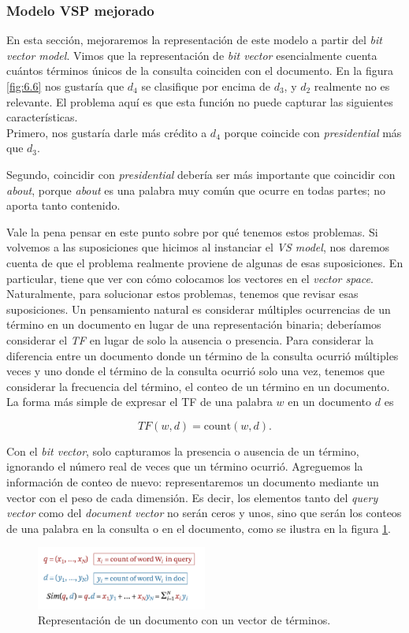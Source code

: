 \subsubsection{Modelo VSP mejorado}

En esta sección, mejoraremos la representación de este modelo a partir del \textit{bit vector model}. Vimos que la representación de \textit{bit vector} esencialmente cuenta cuántos términos únicos de la consulta coinciden con el documento. En la figura \ref{fig:6.6} nos gustaría que $d_4$ se clasifique por encima de $d_3$, y $d_2$ realmente no es relevante. El problema aquí es que esta función no puede capturar las siguientes características.  \\

Primero, nos gustaría darle más crédito a $d_4$ porque coincide con \textit{presidential} más que $d_3$.

Segundo, coincidir con \textit{presidential} debería ser más importante que coincidir con \textit{about}, porque \textit{about} es una palabra muy común que ocurre en todas partes; no aporta tanto contenido.

Vale la pena pensar en este punto sobre por qué tenemos estos problemas. Si volvemos a las suposiciones que hicimos al instanciar el \textit{VS model}, nos daremos cuenta de que el problema realmente proviene de algunas de esas suposiciones. En particular, tiene que ver con cómo colocamos los vectores en el \textit{vector space}. Naturalmente, para solucionar estos problemas, tenemos que revisar esas suposiciones. Un pensamiento natural es considerar múltiples ocurrencias de un término en un documento en lugar de una representación binaria; deberíamos considerar el \textit{TF} en lugar de solo la ausencia o presencia. Para considerar la diferencia entre un documento donde un término de la consulta ocurrió múltiples veces y uno donde el término de la consulta ocurrió solo una vez, tenemos que considerar la frecuencia del término, el conteo de un término en un documento. La forma más simple de expresar el TF de una palabra $w$ en un documento $d$ es

\begin{equation}
TF(w,d) = \text{count}(w,d).
\end{equation}

Con el \textit{bit vector}, solo capturamos la presencia o ausencia de un término, ignorando el número real de veces que un término ocurrió. Agreguemos la información de conteo de nuevo: representaremos un documento mediante un vector con el peso de cada dimensión. Es decir, los elementos tanto del \textit{query vector} como del \textit{document vector} no serán ceros y unos, sino que serán los conteos de una palabra en la consulta o en el documento, como se ilustra en la figura \ref{fig:6.7}.

\begin{figure}[h]
\centering
\includegraphics[width=0.5\textwidth]{fotos/22.png}
\caption{Representación de un documento con un vector de términos.}
\label{fig:6.7}
\end{figure}
